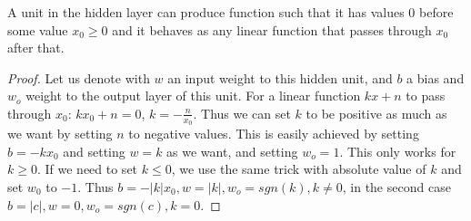 \documentclass[10pt,a4paper]{article}
\begin{document}
\begin{enumerate}
\begin{enumerate}
\begin{lemma}
A unit in the hidden layer can produce function such that it has values $0$ before some value $x_0\geq0$ and it behaves as any linear function that passes through $x_0$ after  that. 
\end{lemma}

\begin{proof}
Let us denote with $w$ an input weight to this hidden unit, and $b$ a bias and $w_o$ weight to the output layer of this unit.
For a linear function $kx+n$ to pass through $x_0$: $kx_0 +n = 0$, $k= -\frac{n}{x_0}$.
Thus we can set $k$ to be positive as much as we want by setting $n$ to negative values.
This is easily achieved by setting $b=-kx_0$ and setting $w=k$ as we want, and setting $w_o=1$. This only works for $k\geq 0$. If we need to set $k\leq 0$, we  use the same trick with absolute value of $k$ and set $w_0$ to $-1$.
Thus  $b=-|k|x_0, w=|k|, w_o=sgn(k), k\neq0$, in the second case $ b=|c|, w=0, w_o=sgn(c), k=0$.
\end{proof}


\end{enumerate}
\end{enumerate}
\end{document}
